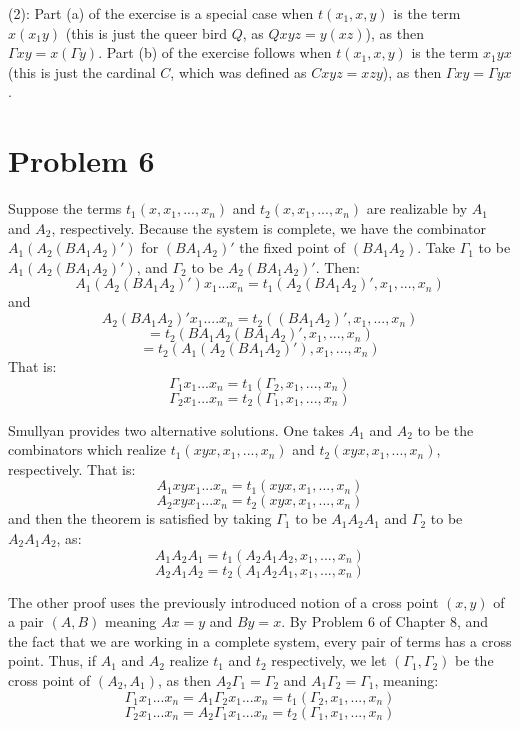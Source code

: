 \documentclass{article}
\theoremstyle{definition}
\begin{document}
(2): Part (a) of the exercise is a special case when $t(x_1,x,y)$ is the term $x(x_1y)$ (this is just the queer bird $Q$, as $Qxyz=y(xz)$), 
as then $\Gamma xy=x(\Gamma y)$. Part (b) of the exercise follows when 
$t(x_1,x,y)$ is the term $x_1yx$ (this is just the cardinal $C$, which was defined as $Cxyz=xzy$), as then $\Gamma xy=\Gamma yx$.

\section*{Problem 6}
Suppose the terms $t_1(x,x_1,...,x_n)$ and $t_2(x,x_1,...,x_n)$ are realizable by $A_1$ and $A_2$, respectively. Because the system is complete, we have the combinator 
$A_1(A_2(BA_1A_2)')$ for $(BA_1A_2)'$ the fixed point of $(BA_1A_2)$. Take $\Gamma_1$ to be $A_1(A_2(BA_1A_2)')$, and $\Gamma_2$ to be 
$A_2(BA_1A_2)'$. Then:
\[ A_1(A_2(BA_1A_2)')x_1...x_n=t_1(A_2(BA_1A_2)',x_1,...,x_n) \] and 
\[ A_2(BA_1A_2)'x_1....x_n=t_2((BA_1A_2)',x_1,...,x_n) \]
\[ =t_2(BA_1A_2(BA_1A_2)',x_1,...,x_n) \]
\[ =t_2(A_1(A_2(BA_1A_2)'),x_1,...,x_n) \]
That is:
\[ \Gamma_1x_1...x_n=t_1(\Gamma_2,x_1,...,x_n) \]
\[ \Gamma_2x_1...x_n=t_2(\Gamma_1,x_1,...,x_n) \]


Smullyan provides two alternative solutions. One takes $A_1$ and $A_2$ to be the combinators which realize 
$t_1(xyx,x_1,...,x_n)$ and $t_2(xyx,x_1,...,x_n)$, respectively. That is:
\[ A_1xyx_1...x_n=t_1(xyx,x_1,...,x_n) \] \[ A_2xyx_1...x_n=t_2(xyx,x_1,...,x_n) \] and then the theorem is satisfied by taking $\Gamma_1$ to be 
$A_1A_2A_1$ and $\Gamma_2$ to be $A_2A_1A_2$, as:
\[ A_1A_2A_1=t_1(A_2A_1A_2,x_1,...,x_n) \]
\[ A_2A_1A_2=t_2(A_1A_2A_1,x_1,...,x_n) \]


The other proof uses the previously introduced notion of a cross point $(x,y)$ of a pair $(A,B)$ meaning $Ax=y$ and $By=x$. By Problem 6 of Chapter 8, and 
the fact that we are working in a complete system, every pair of terms has a cross point. Thus, if $A_1$ and $A_2$ realize $t_1$ and $t_2$ respectively, we let
$(\Gamma_1,\Gamma_2)$ be the cross point of $(A_2,A_1)$, as then $A_2\Gamma_1=\Gamma_2$ and $A_1\Gamma_2=\Gamma_1$, meaning:
\[ \Gamma_1x_1...x_n=A_1\Gamma_2x_1...x_n=t_1(\Gamma_2,x_1,...,x_n) \]
\[ \Gamma_2x_1...x_n=A_2\Gamma_1x_1...x_n=t_2(\Gamma_1,x_1,...,x_n) \] 
\end{document}
